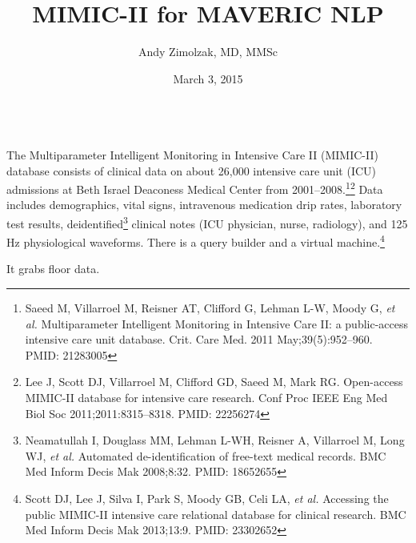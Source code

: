 \documentclass{tufte-handout}
\title{MIMIC-II for MAVERIC NLP}
\author{Andy Zimolzak, MD, MMSc}
\date{March 3, 2015}
\begin{document}
\maketitle

~\\

The Multiparameter Intelligent Monitoring in Intensive Care II
(MIMIC-II) database consists of clinical data on about 26,000
intensive care unit (ICU) admissions at Beth Israel Deaconess Medical
Center from 2001--2008.\footnote{Saeed M, Villarroel M, Reisner AT,
  Clifford G, Lehman L-W, Moody G, \emph{et al.} Multiparameter
  Intelligent Monitoring in Intensive Care II: a public-access
  intensive care unit database. Crit. Care Med. 2011
  May;39(5):952–960. PMID: 21283005}\footnote{Lee J, Scott DJ,
  Villarroel M, Clifford GD, Saeed M, Mark RG. Open-access MIMIC-II
  database for intensive care research. Conf Proc IEEE Eng Med Biol
  Soc 2011;2011:8315–8318. PMID: 22256274} Data includes demographics,
vital signs, intravenous medication drip rates, laboratory test
results, deidentified\footnote{Neamatullah I, Douglass MM, Lehman
  L-WH, Reisner A, Villarroel M, Long WJ, \emph{et al.} Automated
  de-identification of free-text medical records. BMC Med Inform Decis
  Mak 2008;8:32. PMID: 18652655 } clinical notes (ICU physician,
nurse, radiology), and 125 Hz physiological waveforms. There is a
query builder and a virtual machine.\footnote{Scott DJ, Lee J, Silva
  I, Park S, Moody GB, Celi LA, \emph{et al.} Accessing the public
  MIMIC-II intensive care relational database for clinical research.
  BMC Med Inform Decis Mak 2013;13:9. PMID: 23302652 }

It grabs floor data.
\end{document}
